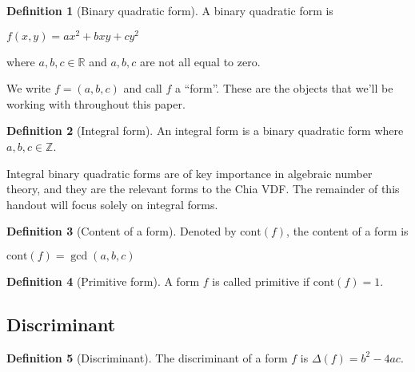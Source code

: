 \documentclass{article}
\theoremstyle{definition}
\newtheorem{definition}{Definition}[section]
\theoremstyle{theorem}
\theoremstyle{example}
\theoremstyle{corollary}
\begin{document}
\bigskip

\theoremstyle{definition}
\begin{definition}[Binary quadratic form]
A binary quadratic form is
\begin{center}
\(f(x, y) = a x^{2} + b x y + c y^{2}\)
\end{center}
where \(a, b, c \in \mathbb{R}\) and \(a, b, c\) are not all equal to zero.
\end{definition}

\bigskip

We write \(f = (a, b, c)\) and call \(f\) a ``form''. These are the objects that we'll be working with throughout this paper.

\bigskip

\theoremstyle{definition}
\begin{definition}[Integral form]
An integral form is a binary quadratic form where \(a, b, c \in \mathbb{Z}\).
\end{definition}

\bigskip

Integral binary quadratic forms are of key importance in algebraic number theory, and they are the relevant forms to the Chia VDF. The remainder of this handout will focus solely on integral forms.

\bigskip

\theoremstyle{definition}
\begin{definition}[Content of a form]
Denoted by \(\textrm{cont}(f)\), the content of a form is
\begin{center}
\(\textrm{cont}(f) = \gcd(a, b, c)\)
\end{center}
\end{definition}

\bigskip

\theoremstyle{definition}
\begin{definition}[Primitive form]
A form \(f\) is called primitive if \(\textrm{cont}(f) = 1\).
\end{definition}

\bigskip

\subsection{Discriminant}

\bigskip

\theoremstyle{definition}
\begin{definition}[Discriminant]
The discriminant of a form \(f\) is \(\Delta(f) = b^{2} - 4ac\).
\end{definition}
\end{document}
